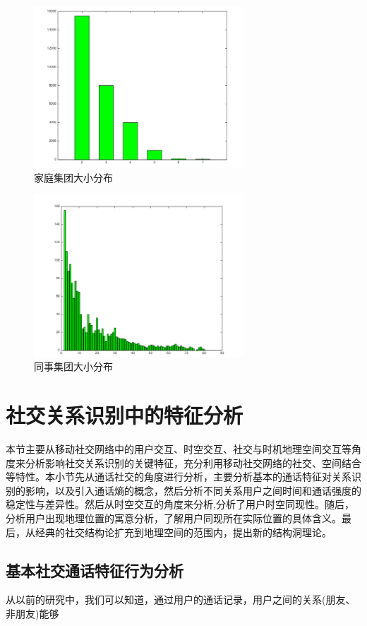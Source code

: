 \begin{figure}[!ht]
    \centering
    \includegraphics[scale=1,width=0.7\textwidth]{figure/FamilyClique.png}
    \caption{家庭集团大小分布}
    \label{fig-familyclique}
\end{figure}

\begin{figure}[!ht]
    \centering
    \includegraphics[scale=1,width=0.7\textwidth]{figure/ColleagueClique.png}
    \caption{同事集团大小分布}
    \label{fig-colleagueclique}
\end{figure}



\section{社交关系识别中的特征分析}

本节主要从移动社交网络中的用户交互、时空交互、社交与时机地理空间交互等角度来分析影响社交关系识别的关键特征，充分利用移动社交网络的社交、空间结合等特性。本小节先从通话社交的角度进行分析，主要分析基本的通话特征对关系识别的影响，以及引入通话熵的概念，然后分析不同关系用户之间时间和通话强度的稳定性与差异性。然后从时空交互的角度来分析,分析了用户时空同现性。随后，分析用户出现地理位置的寓意分析，了解用户同现所在实际位置的具体含义。最后，从经典的社交结构论扩充到地理空间的范围内，提出新的结构洞理论。

\subsection{基本社交通话特征行为分析}

从以前的研究中，我们可以知道，通过用户的通话记录，用户之间的关系(朋友、非朋友)能够















